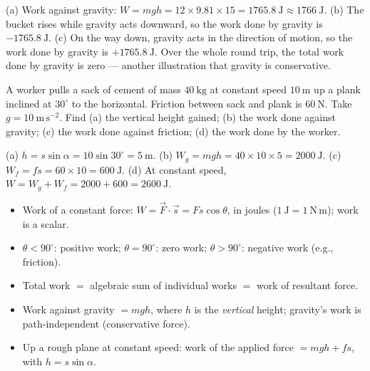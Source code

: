 \documentclass[11pt]{article}
\begin{document}
\begin{corrige}[Exercise 1]
(a) Work against gravity: $W = mgh = 12 \times 9.81 \times 15 = 1765.8\ \mathrm{J} \approx 1766\ \mathrm{J}$.
(b) The bucket rises while gravity acts downward, so the work done by gravity is $-1765.8\ \mathrm{J}$.
(c) On the way down, gravity acts in the direction of motion, so the work done by gravity is $+1765.8\ \mathrm{J}$. Over the whole round trip, the total work done by gravity is zero --- another illustration that gravity is conservative.
\end{corrige}

\begin{exercice}
A worker pulls a sack of cement of mass $40\ \mathrm{kg}$ at constant speed $10\ \mathrm{m}$ up a plank inclined at $30^\circ$ to the horizontal. Friction between sack and plank is $60\ \mathrm{N}$. Take $g = 10\ \mathrm{m\,s^{-2}}$. Find (a) the vertical height gained; (b) the work done against gravity; (c) the work done against friction; (d) the work done by the worker.
\end{exercice}

\begin{corrige}[Exercise 2]
(a) $h = s\sin\alpha = 10\sin 30^\circ = 5\ \mathrm{m}$.
(b) $W_g = mgh = 40 \times 10 \times 5 = 2000\ \mathrm{J}$.
(c) $W_f = fs = 60 \times 10 = 600\ \mathrm{J}$.
(d) At constant speed, $W = W_g + W_f = 2000 + 600 = 2600\ \mathrm{J}$.
\end{corrige}

\begin{aretenir}
\begin{itemize}
\item Work of a constant force: $W = \vec{F}\cdot\vec{s} = Fs\cos\theta$, in joules ($1\ \mathrm{J} = 1\ \mathrm{N\,m}$); work is a scalar.
\item $\theta < 90^\circ$: positive work; $\theta = 90^\circ$: zero work; $\theta > 90^\circ$: negative work (e.g., friction).
\item Total work $=$ algebraic sum of individual works $=$ work of resultant force.
\item Work against gravity $= mgh$, where $h$ is the \emph{vertical} height; gravity's work is path-independent (conservative force).
\item Up a rough plane at constant speed: work of the applied force $= mgh + fs$, with $h = s\sin\alpha$.
\end{itemize}
\end{aretenir}
\end{document}
